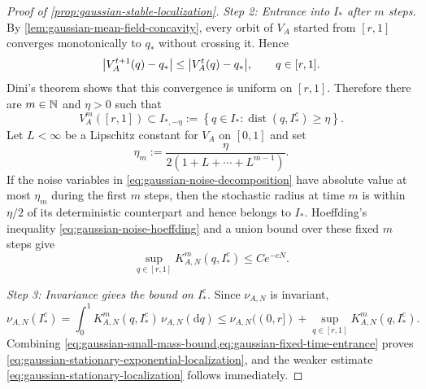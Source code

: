 \documentclass[11pt,reqno,a4paper]{article}
\begin{document}
\begin{proof}[Proof of \cref{prop:gaussian-stable-localization}]
  \emph{Step 2: Entrance into $I_\ast$ after $m$ steps.}
  By
  \cref{lem:gaussian-mean-field-concavity}, every orbit of $V_A$ started from
  $[r,1]$ converges monotonically to $q_\ast$ without crossing it.
  Hence
  \begin{equation*}
    \abs{V_A^{t+1}(q)-q_\ast}
    \leq
    \abs{V_A^t(q)-q_\ast},
    \qquad q\in[r,1].
  \end{equation*}
  Dini's theorem shows that this convergence is uniform on $[r,1]$.
  Therefore there are $m\in\mathbb{N}$ and $\eta>0$ such that
  \begin{equation}\label{eq:gaussian-deterministic-fixed-entrance}
    V_A^m([r,1])
    \subset
    I_{\ast,-\eta}
    :=
    \left\{
      q\in I_\ast:\operatorname{dist}(q,I_\ast^c)\geq\eta
    \right\}.
  \end{equation}
  Let $L<\infty$ be a Lipschitz constant for $V_A$ on $[0,1]$ and set
  \begin{equation*}
    \eta_m:=\frac{\eta}{2(1+L+\cdots+L^{m-1})}.
  \end{equation*}
  If the noise variables in \cref{eq:gaussian-noise-decomposition} have
  absolute value at most $\eta_m$ during the first $m$ steps, then the
  stochastic radius at time $m$ is within $\eta/2$ of its deterministic
  counterpart and hence belongs to $I_\ast$. Hoeffding's inequality
  \cref{eq:gaussian-noise-hoeffding} and a union bound over these fixed
  $m$ steps give
  \begin{equation}\label{eq:gaussian-fixed-time-entrance}
    \sup_{q\in[r,1]}
    K_{A,N}^m(q,I_\ast^c)
    \leq
    C e^{-cN}.
  \end{equation}

  \emph{Step 3: Invariance gives the bound on $I_\ast^c$.}
  Since $\nu_{A,N}$ is invariant,
  \begin{equation*}
    \nu_{A,N}(I_\ast^c)
    =
    \int_0^1 K_{A,N}^m(q,I_\ast^c)\,\nu_{A,N}(\mathrm{d}q)
    \leq
    \nu_{A,N}((0,r])
    +
    \sup_{q\in[r,1]}K_{A,N}^m(q,I_\ast^c).
  \end{equation*}
  Combining \cref{eq:gaussian-small-mass-bound,eq:gaussian-fixed-time-entrance}
  proves \cref{eq:gaussian-stationary-exponential-localization}, and the
  weaker estimate \cref{eq:gaussian-stationary-localization} follows
  immediately.
\end{proof}
\end{document}
